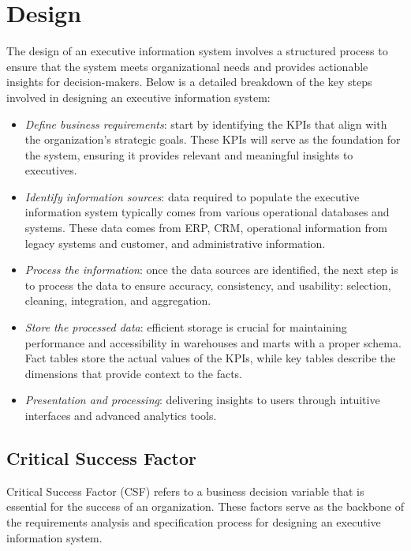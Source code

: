 \section{Design}

The design of an executive information system involves a structured process to ensure that the system meets organizational needs and provides actionable insights for decision-makers. 
Below is a detailed breakdown of the key steps involved in designing an executive information system:
\begin{itemize}
    \item \textit{Define business requirements}: start by identifying the KPIs that align with the organization's strategic goals. 
        These KPIs will serve as the foundation for the system, ensuring it provides relevant and meaningful insights to executives.
    \item \textit{Identify information sources}: data required to populate the executive information system typically comes from various operational databases and systems.
        These data comes from ERP, CRM, operational information from legacy systems and customer, and administrative information. 
    \item \textit{Process the information}: once the data sources are identified, the next step is to process the data to ensure accuracy, consistency, and usability: selection, cleaning, integration, and aggregation. 
    \item \textit{Store the processed data}: efficient storage is crucial for maintaining performance and accessibility in warehouses and marts with a proper schema. 
        Fact tables store the actual values of the KPIs, while key tables describe the dimensions that provide context to the facts.
    \item \textit{Presentation and processing}: delivering insights to users through intuitive interfaces and advanced analytics tools. 
\end{itemize}

\subsection{Critical Success Factor}
Critical Success Factor (CSF) refers to a business decision variable that is essential for the success of an organization.
These factors serve as the backbone of the requirements analysis and specification process for designing an executive information system.

